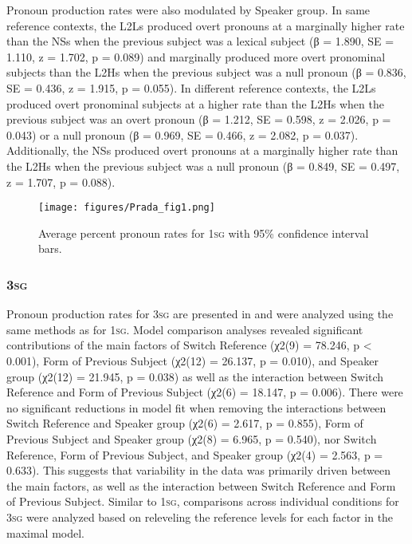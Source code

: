 \documentclass[output=paper,colorlinks,citecolor=brown,draftmode]{langscibook}
\begin{document}
Pronoun production rates were also modulated by Speaker group. In same reference contexts, the L2Ls produced overt pronouns at a marginally higher rate than the NSs when the previous subject was a lexical subject (β = 1.890, SE = 1.110, z = 1.702, p = 0.089) and marginally produced more overt pronominal subjects than the L2Hs when the previous subject was a null pronoun (β = 0.836, SE = 0.436, z = 1.915, p = 0.055). In different reference contexts, the L2Ls produced overt pronominal subjects at a higher rate than the L2Hs when the previous subject was an overt pronoun (β = 1.212, SE = 0.598, z = 2.026, p = 0.043) or a null pronoun (β = 0.969, SE = 0.466, z = 2.082, p = 0.037). Additionally, the NSs produced overt pronouns at a marginally higher rate than the L2Hs when the previous subject was a null pronoun (β = 0.849, SE = 0.497, z = 1.707, p = 0.088).


\begin{figure}
  \caption{Average percent pronoun rates for 1\textsc{sg} with 95\% confidence interval bars.}
  \label{Figure 1}
    \texttt{[image: figures/Prada\_fig1.png]}
\end{figure}

\subsubsection{3\textsc{sg}}

Pronoun production rates for 3\textsc{sg} are presented in  and were analyzed using the same methods as for 1\textsc{sg}. Model comparison analyses revealed significant contributions of the main factors of Switch Reference (χ2(9) = 78.246, p < 0.001), Form of Previous Subject (χ2(12) = 26.137, p = 0.010), and Speaker group (χ2(12) = 21.945, p = 0.038) as well as the interaction between Switch Reference and Form of Previous Subject (χ2(6) = 18.147, p = 0.006). There were no significant reductions in model fit when removing the interactions between Switch Reference and Speaker group (χ2(6) = 2.617, p = 0.855), Form of Previous Subject and Speaker group (χ2(8) = 6.965, p = 0.540), nor Switch Reference, Form of Previous Subject, and Speaker group (χ2(4) = 2.563, p = 0.633). This suggests that variability in the data was primarily driven between the main factors, as well as the interaction between Switch Reference and Form of Previous Subject. Similar to 1\textsc{sg}, comparisons across individual conditions for 3\textsc{sg} were analyzed based on releveling the reference levels for each factor in the maximal model.
\end{document}
